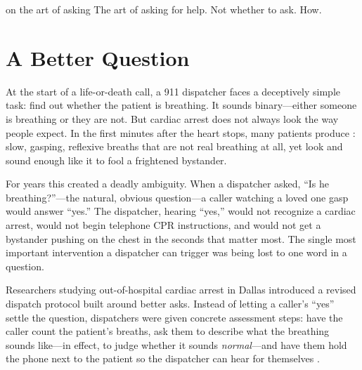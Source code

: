 
\label{chap:ch05}
\begin{chapterquote}{on the art of asking}
The art of asking for help. Not whether to ask. How.
\end{chapterquote}

\section{A Better Question}
\label{sec:ch05-one-word}

At the start of a life-or-death call, a 911 dispatcher faces a deceptively simple task: find out whether the patient is breathing. It sounds binary---either someone is breathing or they are not. But cardiac arrest does not always look the way people expect. In the first minutes after the heart stops, many patients produce : slow, gasping, reflexive breaths that are not real breathing at all, yet look and sound enough like it to fool a frightened bystander.

For years this created a deadly ambiguity. When a dispatcher asked, ``Is he breathing?''---the natural, obvious question---a caller watching a loved one gasp would answer ``yes.'' The dispatcher, hearing ``yes,'' would not recognize a cardiac arrest, would not begin telephone CPR instructions, and would not get a bystander pushing on the chest in the seconds that matter most. The single most important intervention a dispatcher can trigger was being lost to one word in a question.

Researchers studying out-of-hospital cardiac arrest in Dallas introduced a revised dispatch protocol built around better asks. Instead of letting a caller's ``yes'' settle the question, dispatchers were given concrete assessment steps: have the caller count the patient's breaths, ask them to describe what the breathing sounds like---in effect, to judge whether it sounds \emph{normal}---and have them hold the phone next to the patient so the dispatcher can hear for themselves \autocite{roppolo2009agonal}.


